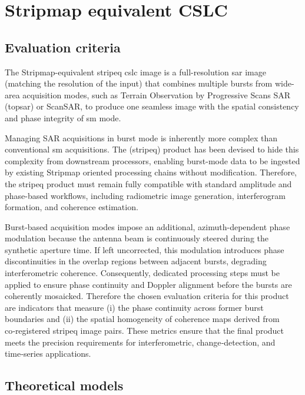 \section{Stripmap equivalent CSLC}
\label{sec:stripeq}

\subsection{Evaluation criteria}
\label{sec:stripeq_criteria}

The Stripmap-equivalent \acs{stripeq} \acs{cslc} image is a full-resolution \acs{sar} image (matching the resolution of the input) that combines multiple bursts from wide-area acquisition modes, such as Terrain Observation by Progressive Scans SAR (\acs{topsar}) or ScanSAR, to produce one seamless image with the spatial consistency and phase integrity of \acs{sm} mode.

Managing SAR acquisitions in burst mode is inherently more complex than conventional \acs{sm} acquisitions. The (\acs{stripeq}) product has been devised to hide this complexity from downstream processors, enabling burst-mode data to be ingested by existing Stripmap oriented processing chains without modification. Therefore, the \acs{stripeq} product must remain fully compatible with standard amplitude and phase-based workflows, including radiometric image generation, interferogram formation, and coherence estimation.

Burst-based acquisition modes impose an additional, azimuth-dependent phase modulation because the antenna beam is continuously steered during the synthetic aperture time. If left uncorrected, this modulation introduces phase discontinuities in the overlap regions between adjacent bursts, degrading interferometric coherence. Consequently, dedicated processing steps must be applied to ensure phase continuity and Doppler alignment before the bursts are coherently mosaicked. Therefore the chosen evaluation criteria for this product are indicators that measure (i) the phase continuity across former burst boundaries and (ii) the spatial homogeneity of coherence maps derived from co‑registered \acs{stripeq} image pairs. These metrics ensure that the final product meets the precision requirements for interferometric, change‑detection, and time‑series applications.

\subsection{Theoretical models}
\label{sec:stripeq_models}



